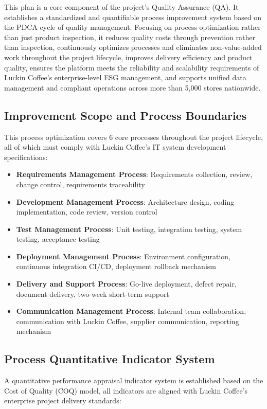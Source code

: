 \documentclass[12pt,a4paper]{article}
\begin{document}
This plan is a core component of the project's Quality Assurance (QA). It establishes a standardized and quantifiable process improvement system based on the PDCA cycle of quality management. Focusing on process optimization rather than just product inspection, it reduces quality costs through prevention rather than inspection, continuously optimizes processes and eliminates non-value-added work throughout the project lifecycle, improves delivery efficiency and product quality, ensures the platform meets the reliability and scalability requirements of Luckin Coffee's enterprise-level ESG management, and supports unified data management and compliant operations across more than 5,000 stores nationwide.

\subsection{Improvement Scope and Process Boundaries}
This process optimization covers 6 core processes throughout the project lifecycle, all of which must comply with Luckin Coffee's IT system development specifications:
\begin{itemize}[leftmargin=*]
    \item \textbf{Requirements Management Process}: Requirements collection, review, change control, requirements traceability
    \item \textbf{Development Management Process}: Architecture design, coding implementation, code review, version control
    \item \textbf{Test Management Process}: Unit testing, integration testing, system testing, acceptance testing
    \item \textbf{Deployment Management Process}: Environment configuration, continuous integration CI/CD, deployment rollback mechanism
    \item \textbf{Delivery and Support Process}: Go-live deployment, defect repair, document delivery, two-week short-term support
    \item \textbf{Communication Management Process}: Internal team collaboration, communication with Luckin Coffee, supplier communication, reporting mechanism
\end{itemize}

\subsection{Process Quantitative Indicator System}
A quantitative performance appraisal indicator system is established based on the Cost of Quality (COQ) model, all indicators are aligned with Luckin Coffee's enterprise project delivery standards:
\end{document}
